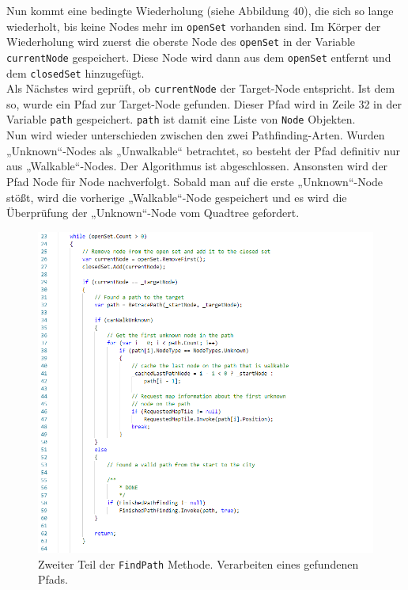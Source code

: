 \documentclass[a4paper,12pt]{article}
\newcommand{\code}{\texttt}
\begin{document}
Nun kommt eine bedingte Wiederholung (siehe Abbildung 40), die sich so lange wiederholt, bis keine Nodes mehr im \code{openSet} vorhanden sind.
Im Körper der Wiederholung wird zuerst die oberste Node des \code{openSet} in der Variable \code{currentNode} gespeichert. Diese Node wird dann aus dem \code{openSet} entfernt und dem \code{closedSet} hinzugefügt.
\\[0.4cm]
Als Nächstes wird geprüft, ob \code{currentNode} der Target-Node entspricht. Ist dem so, wurde ein Pfad zur Target-Node gefunden. Dieser Pfad wird in Zeile 32 in der Variable \code{path} gespeichert. \code{path} ist damit eine Liste von \code{Node} Objekten.
\\[0.4cm]
Nun wird wieder unterschieden zwischen den zwei Pathfinding-Arten. Wurden „Unknown“-Nodes als „Unwalkable“ betrachtet, so besteht der Pfad definitiv nur aus „Walkable“-Nodes. Der Algorithmus ist abgeschlossen. Ansonsten wird der Pfad Node für Node nachverfolgt. Sobald man auf die erste „Unknown“-Node stößt, wird die vorherige „Walkable“-Node gespeichert und es wird die Überprüfung der „Unknown“-Node vom Quadtree gefordert.
\begin{figure}[H]
    \centering
    \includegraphics[width=1\linewidth]{Bilder/Aufgabe3/Pathfinding_02.png}
    \caption{Zweiter Teil der \code{FindPath} Methode. Verarbeiten eines gefundenen Pfads.}
\end{figure}
\end{document}
